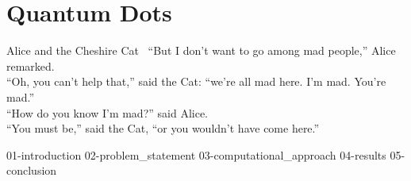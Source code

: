 \chapter{\label{ch:quantum dots}Quantum Dots}

\begin{frontquote}{Alice and the Cheshire Cat~\cite{wonderland}}
``But I don’t want to go among mad people,'' Alice remarked. \\
``Oh, you can't help that,'' said the Cat: ``we're all mad here. I'm mad. You're mad.'' \\
``How do you know I'm mad?'' said Alice. \\
``You must be,'' said the Cat, ``or you wouldn't have come here.''\\
\end{frontquote}

{01-introduction}
{02-problem_statement}
{03-computational_approach}
{04-results}
{05-conclusion}
